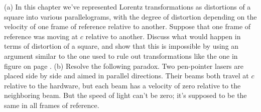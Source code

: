 (a) In this chapter we've represented Lorentz transformations as distortions of a square into
various parallelograms, with the degree of distortion depending on the velocity of one
frame of reference relative to another. Suppose that one frame of reference was moving
at $c$ relative to another. Discuss what would happen in terms of distortion of a square,
and show that this is impossible by using an argument similar to the one used to rule out
transformations like the one in figure  on page \pageref{fig:bowtie}.\hwendpart
(b) Resolve the following paradox. Two pen-pointer lasers are placed side by side and aimed in parallel
directions. Their beams both travel at $c$ relative to the hardware, but each beam has a velocity of zero relative to the neighboring beam.
But the speed of light can't be zero; it's supposed to be the same in all frames of reference.
